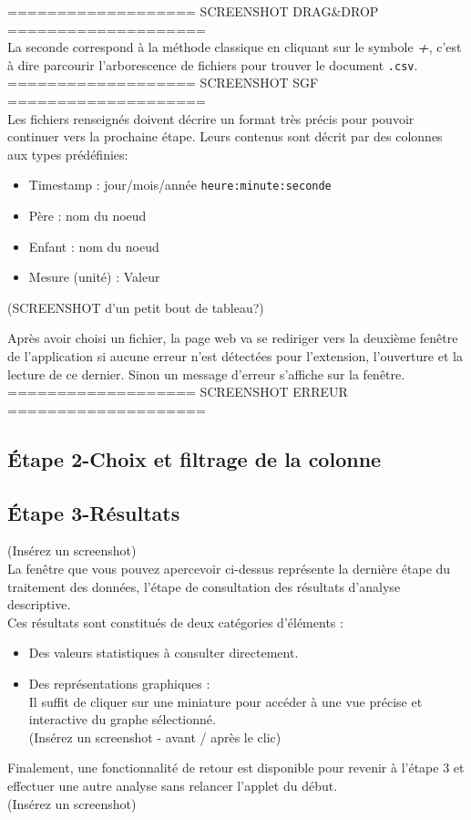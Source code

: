 		=================== SCREENSHOT DRAG\&DROP ====================\\
		  
		 La seconde correspond à la méthode classique en cliquant sur le symbole \textbf{\textit{+}}, c'est à dire parcourir l'arborescence de fichiers pour trouver le document \lstinline!.csv!.\\
		 
		=================== SCREENSHOT SGF ====================\\
	
		Les fichiers renseignés doivent décrire un format très précis pour pouvoir continuer vers la prochaine étape. Leurs contenus sont décrit par des colonnes aux types prédéfinies:
		\begin{itemize}
		\item Timestamp : jour/mois/année	\lstinline!heure:minute:seconde!
		\item Père : nom du noeud
		\item Enfant : nom du noeud
		\item Mesure (unité) : Valeur
		\end{itemize}
		
		(SCREENSHOT d'un petit bout de tableau?)
		
		Après avoir choisi un fichier, la page web va se rediriger vers la deuxième fenêtre de l'application si aucune erreur n'est détectées pour l'extension, l'ouverture et la lecture de ce dernier. Sinon un message d'erreur s'affiche sur la fenêtre.\\
		
				
		=================== SCREENSHOT ERREUR ====================\\		
	\subsection{Étape 2-Choix et filtrage de la colonne}
	\subsection{Étape 3-Résultats}
			(Insérez un screenshot)\\
		La fenêtre que vous pouvez apercevoir ci-dessus représente la dernière étape du traitement des données, l'étape de consultation des résultats d'analyse descriptive.\\
		Ces résultats sont constitués de deux catégories d'éléments :
		\begin{itemize}
			\item Des valeurs statistiques à consulter directement.
			\item Des représentations graphiques :\\
				Il suffit de cliquer sur une miniature pour accéder à une vue précise et interactive du graphe sélectionné.\\
			(Insérez un screenshot - avant / après le clic)			
		\end{itemize}
		Finalement, une fonctionnalité de retour est disponible pour revenir à l'étape 3 et effectuer une autre analyse sans relancer l'applet du début.\\
			(Insérez un screenshot)

